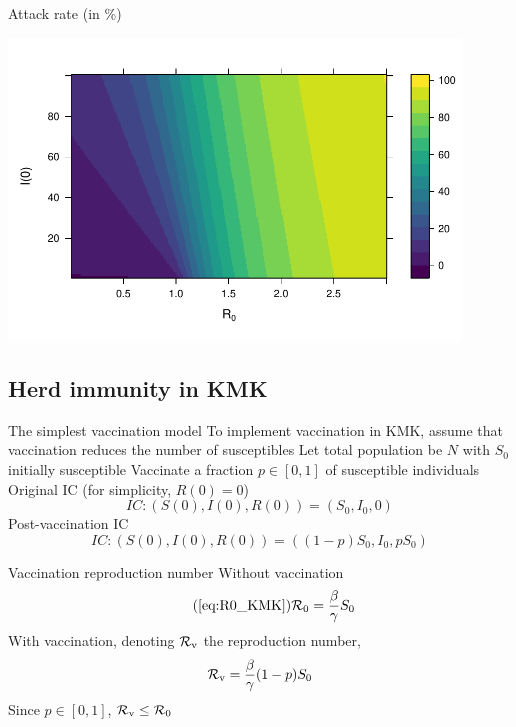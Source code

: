 \documentclass[aspectratio=169]{beamer}\usepackage[]{graphicx}\usepackage[]{xcolor}
\begin{document}
\begin{frame}{Attack rate (in \%)}
  \begin{center}
    \includegraphics[width=0.9\textwidth]{FIGS/L04-KMK_attack_rate-1.pdf}
  \end{center}
\end{frame}


\subsection{Herd immunity in KMK}


\begin{frame}{The simplest vaccination model}
To implement vaccination in KMK, assume that vaccination reduces the number of susceptibles
\vfill
Let total population be $N$ with $S_0$ initially susceptible
\vfill
Vaccinate a fraction $p\in[0,1]$ of susceptible individuals
\vfill
Original IC (for simplicity, $R(0)=0$)
\begin{equation}\label{eq:IC_KMK_novacc}
IC: (S(0),I(0),R(0)) = (S_0,I_0,0)
\end{equation}
Post-vaccination IC 
\begin{equation}\label{eq:IC_KMK_vacc}
IC: (S(0),I(0),R(0)) = ((1-p)S_0,I_0,pS_0)
\end{equation}
\end{frame}


\begin{frame}{Vaccination reproduction number}
  Without vaccination
  \begin{equation}\tag{\ref{eq:R0_KMK}}
    \R_0=\frac{\beta}{\gamma}S_0
  \end{equation}
  \vfill
  With vaccination, denoting $\mathcal{R}_{\text{v}}$ the reproduction number,
  \begin{equation}
    \mathcal{R}_{\text{v}} = \frac{\beta}{\gamma}(1-p)S_0
  \end{equation}
  \vfill
  Since $p\in[0,1]$, $\mathcal{R}_{\text{v}}\leq\mathcal{R}_0$
\end{frame}
\end{document}
